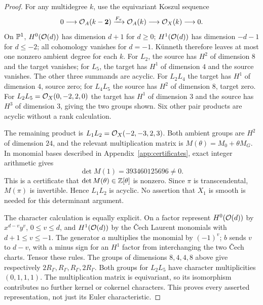\begin{proof}
For any multidegree $k$, use the equivariant Koszul sequence
\[
 0\longrightarrow\mathcal{O}_A(k-\mathbf2)
 \xrightarrow{F_\pi}\mathcal{O}_A(k)\longrightarrow\mathcal{O}_X(k)\longrightarrow0.
\]
On $\mathbb{P}^1$, $H^0(\mathcal{O}(d))$ has dimension $d+1$ for $d\ge0$;
$H^1(\mathcal{O}(d))$ has dimension $-d-1$ for $d\le-2$; all cohomology
vanishes for $d=-1$. K\"unneth therefore leaves at most one nonzero
ambient degree for each $k$.
For $L_2$, the source has $H^2$ of dimension $8$ and the target
vanishes; for $L_5$, the target has $H^1$ of dimension $4$ and the
source vanishes. The other three summands are acyclic.
For $L_2L_4$ the target has $H^1$ of dimension $4$, source zero;
for $L_4L_5$ the source has $H^2$ of dimension $8$, target zero.
For $L_2L_5=\mathcal{O}_X(0,-2,2,0)$ the target has $H^1$ of dimension $3$
and the source has $H^3$ of dimension $3$, giving the two groups shown.
Six other pair products are acyclic without a rank calculation.

The remaining product is $L_1L_2=\mathcal{O}_X(-2,-3,2,3)$. Both ambient
groups are $H^2$ of dimension $24$, and the relevant multiplication
matrix is $M(\theta)=M_0+\theta M_G$. In monomial bases described in
Appendix~\ref{app:certificates}, exact integer arithmetic gives
\begin{equation}\label{eq:detcertificate}
 \det M(1)=393460125696\ne0.
\end{equation}
This is a certificate that $\det M(\theta)\in\mathbb{Z}[\theta]$ is nonzero.
Since $\pi$ is transcendental, $M(\pi)$ is invertible. Hence $L_1L_2$
is acyclic. No assertion that $X_1$ is smooth is needed for this
determinant argument.

The character calculation is equally explicit. On a factor represent
$H^0(\mathcal{O}(d))$ by $x^{d-v}y^v$, $0\le v\le d$, and
$H^1(\mathcal{O}(d))$ by the \v Cech Laurent monomials with
$d+1\le v\le-1$. The generator $a$ multiplies the monomial by $(-1)^v$;
$b$ sends $v$ to $d-v$, with a minus sign for an $H^1$ factor from
interchanging the two \v Cech charts. Tensor these rules.
The groups of dimensions $8,4,4,8$ above give respectively
$2R_\Gamma,R_\Gamma,R_\Gamma,2R_\Gamma$.
Both groups for $L_2L_5$ have character multiplicities $(0,1,1,1)$.
The multiplication matrix is equivariant, so its isomorphism contributes
no further kernel or cokernel characters. This proves every asserted
representation, not just its Euler characteristic.
\end{proof}

